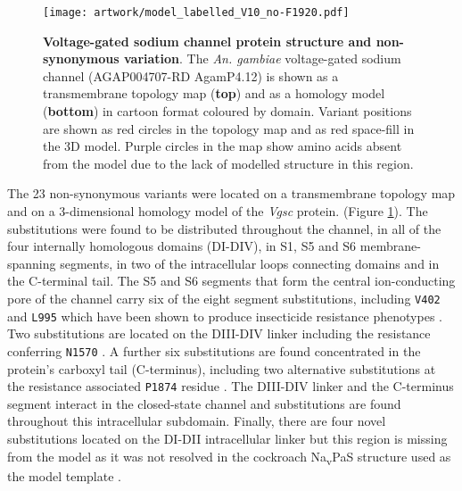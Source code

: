 \documentclass[a4paper,11pt,abstracton,hidelinks]{scrartcl}
\begin{document}
%
\begin{figure}[!t]

  \centering

  \texttt{[image: artwork/model\_labelled\_V10\_no-F1920.pdf]}

  \caption{\textbf{Voltage-gated sodium channel protein structure and non-synonymous variation}. The \textit{An. gambiae} voltage-gated sodium channel (AGAP004707-RD AgamP4.12) is shown as a transmembrane topology map (\textbf{top}) and as a homology model (\textbf{bottom}) in cartoon format coloured by domain. Variant positions are shown as red circles in the topology map and as red space-fill in the 3D model. Purple circles in the map show amino acids absent from the model due to the lack of modelled structure in this region.}

  \label{fig:protein}

\end{figure}


The 23 non-synonymous variants were located on a transmembrane topology map and on a 3-dimensional homology model of the \textit{Vgsc} protein. (Figure \ref{fig:protein}).
The substitutions were found to be distributed throughout the channel, in all of the four internally homologous domains (DI-DIV), in S1, S5 and S6 membrane-spanning segments, in two of the intracellular loops connecting domains and in the C-terminal tail.
%
The S5 and S6 segments that form the central ion-conducting pore of the channel carry six of the eight segment substitutions, including \texttt{V402} and \texttt{L995} which have been shown to produce insecticide resistance phenotypes \cite{Davies2007a, Dong2014, Martinez-Torres1998,Silva2014, Ranson2000}.
%
Two substitutions are located on the DIII-DIV linker including the resistance conferring \texttt{N1570} \cite{Jones2012}. 
%
A further six substitutions are found concentrated in the protein's carboxyl tail (C-terminus), including two alternative substitutions at the resistance associated \texttt{P1874} residue \cite{Sonoda2008}. 
%
The DIII-DIV linker and the C-terminus segment interact in the closed-state channel and substitutions are found throughout this intracellular subdomain.  
%
Finally, there are four novel substitutions located on the DI-DII intracellular linker but this region is missing from the model as it was not resolved in the cockroach Na\textsubscript{v}PaS structure used as the model template \cite{Shen2017}. 
\end{document}
